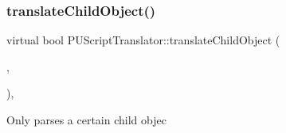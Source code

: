 \mbox{\label{classPUScriptTranslator_abd0b4087860ff1f66b41dc3a1f1eb1bb}} 
\subsubsection{\texorpdfstring{translate\+Child\+Object()}{translateChildObject()}\hspace{0.1cm}{\footnotesize\ttfamily [1/2]}}
{\footnotesize\ttfamily virtual bool P\+U\+Script\+Translator\+::translate\+Child\+Object (\begin{DoxyParamCaption}\item[{\hyperlink{classPUScriptCompiler}{P\+U\+Script\+Compiler} $\ast$}]{,  }\item[{\hyperlink{classPUAbstractNode}{P\+U\+Abstract\+Node} $\ast$}]{ }\end{DoxyParamCaption})\hspace{0.3cm}{\ttfamily [inline]}, {\ttfamily [virtual]}}

Only parses a certain child objec 

